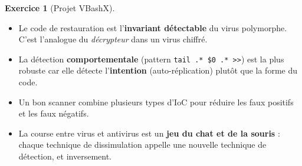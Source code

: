 \documentclass[a4paper,11pt]{article}
\theoremstyle{plain}
\theoremstyle{definition}
\newtheorem{exercice}{Exercice}
\begin{document}
\begin{exercice}[Projet VBashX]
\begin{correction}
\begin{pointcle}
\begin{itemize}
    \item Le code de restauration est l'\textbf{invariant détectable} du virus polymorphe. C'est l'analogue du \textit{décrypteur} dans un virus chiffré.
    \item La détection \textbf{comportementale} (pattern \texttt{tail .* \$0 .* >>}) est la plus robuste car elle détecte l'\textbf{intention} (auto-réplication) plutôt que la forme du code.
    \item Un bon scanner combine plusieurs types d'IoC pour réduire les faux positifs et les faux négatifs.
    \item La course entre virus et antivirus est un \textbf{jeu du chat et de la souris} : chaque technique de dissimulation appelle une nouvelle technique de détection, et inversement.
\end{itemize}
\end{pointcle}

\end{correction}

\end{exercice}
\end{document}
